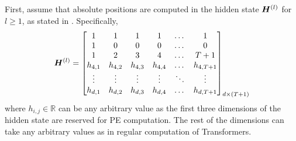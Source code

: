 \documentclass{article}
\begin{document}
First, assume that absolute positions are computed in the hidden state ${\bm{H}}^{(l)}$ for $l\ge 1$, as stated in . Specifically,
\begin{align}
  \label{eq:rel_hidden_state_1}
  {\bm{H}}^{(l)} = \begin{bmatrix}
                1       & 1       & 1       & 1       & \dots  & 1         \\
                1       & 0       & 0       & 0       & \dots  & 0         \\
                1       & 2       & 3       & 4       & \dots  & T+1       \\
                h_{4,1} & h_{4,2} & h_{4,3} & h_{4,4} & \dots  & h_{4,T+1} \\
                \vdots  & \vdots  & \vdots  & \vdots  & \ddots & \vdots    \\
                h_{d,1} & h_{d,2} & h_{d,3} & h_{d,4} & \dots  & h_{d,T+1}
              \end{bmatrix}_{d \times (T+1)}
\end{align}
where $h_{i,j} \in \mathbb{R}$ can be any arbitrary value as the first three dimensions of the hidden state are reserved for PE computation. The rest of the dimensions can take any arbitrary values as in regular computation of Transformers.
\end{document}
